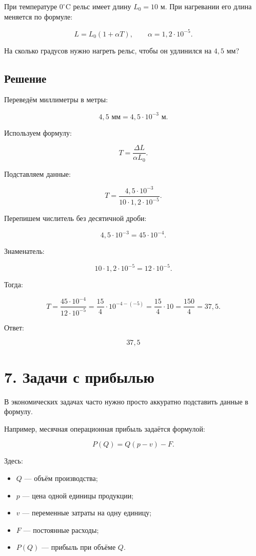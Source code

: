 \documentclass[a4paper,12pt]{article}
\begin{document}
При температуре \(0^\circ\text{C}\) рельс имеет длину \(L_0=10\) м. При нагревании его длина меняется по формуле:

\[
L=L_0(1+\alpha T),
\qquad
\alpha=1{,}2\cdot10^{-5}.
\]

На сколько градусов нужно нагреть рельс, чтобы он удлинился на \(4{,}5\) мм?

\subsection*{Решение}

Переведём миллиметры в метры:

\[
4{,}5\text{ мм}=4{,}5\cdot10^{-3}\text{ м}.
\]

Используем формулу:

\[
T=\frac{\Delta L}{\alpha L_0}.
\]

Подставляем данные:

\[
T=\frac{4{,}5\cdot10^{-3}}{10\cdot1{,}2\cdot10^{-5}}.
\]

Перепишем числитель без десятичной дроби:

\[
4{,}5\cdot10^{-3}=45\cdot10^{-4}.
\]

Знаменатель:

\[
10\cdot1{,}2\cdot10^{-5}=12\cdot10^{-5}.
\]

Тогда:

\[
T=\frac{45\cdot10^{-4}}{12\cdot10^{-5}}
=\frac{15}{4}\cdot10^{-4-(-5)}
=\frac{15}{4}\cdot10
=\frac{150}{4}
=37{,}5.
\]

Ответ:

\[
\boxed{37{,}5}
\]

\section*{7. Задачи с прибылью}

В экономических задачах часто нужно просто аккуратно подставить данные в формулу.

Например, месячная операционная прибыль задаётся формулой:

\[
P(Q)=Q(p-v)-F.
\]

Здесь:

\begin{itemize}
  \item \(Q\) — объём производства;
  \item \(p\) — цена одной единицы продукции;
  \item \(v\) — переменные затраты на одну единицу;
  \item \(F\) — постоянные расходы;
  \item \(P(Q)\) — прибыль при объёме \(Q\).
\end{itemize}
\end{document}
